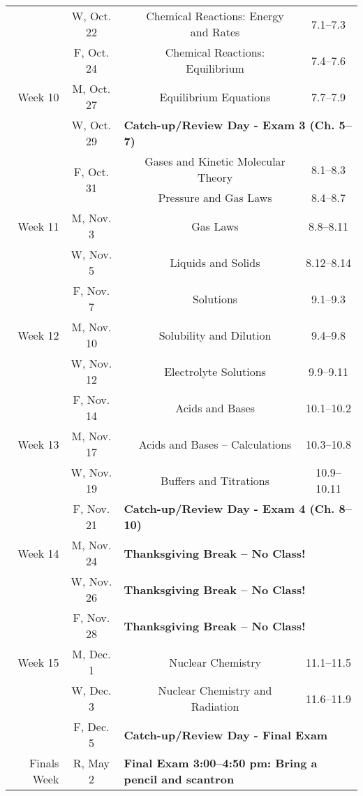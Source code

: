 \begin{tabular}{rcccc}
& W, Oct. 22&& Chemical Reactions: Energy and Rates & 7.1--7.3\\
& F, Oct. 24&& Chemical Reactions: Equilibrium & 7.4--7.6\\
\midrule
Week 10 & M, Oct. 27&& Equilibrium Equations & 7.7--7.9\\
& W, Oct. 29& \multicolumn{3}{l}{\textbf{Catch-up/Review Day - Exam 3 (Ch. 5--7)}}\\
& \multirow{2}{*}{F, Oct. 31}& & Gases and Kinetic Molecular Theory & 8.1--8.3\\
& & & Pressure and Gas Laws & 8.4--8.7\\
\midrule
Week 11 & M, Nov. 3&& Gas Laws & 8.8--8.11\\
& W, Nov. 5&& Liquids and Solids & 8.12--8.14\\
& F, Nov. 7&& Solutions & 9.1--9.3\\
\midrule
Week 12 & M, Nov. 10&& Solubility and Dilution & 9.4--9.8\\
& W, Nov. 12&& Electrolyte Solutions & 9.9--9.11\\
& F, Nov. 14&& Acids and Bases & 10.1--10.2\\
\midrule
Week 13 & M, Nov. 17&& Acids and Bases -- Calculations & 10.3--10.8\\
& W, Nov. 19&& Buffers and Titrations & 10.9--10.11\\
& F, Nov. 21& \multicolumn{3}{l}{\textbf{Catch-up/Review Day - Exam 4 (Ch. 8--10)}}\\
\midrule
Week 14 & M, Nov. 24& \multicolumn{3}{l}{\textbf{Thanksgiving Break -- No Class!}}\\
& W, Nov. 26& \multicolumn{3}{l}{\textbf{Thanksgiving Break -- No Class!}}\\
& F, Nov. 28& \multicolumn{3}{l}{\textbf{Thanksgiving Break -- No Class!}}\\
\midrule
Week 15 & M, Dec. 1&& Nuclear Chemistry & 11.1--11.5\\
& W, Dec. 3&& Nuclear Chemistry and Radiation & 11.6--11.9\\
& F, Dec. 5& \multicolumn{3}{l}{\textbf{Catch-up/Review Day - Final Exam}}\\
\midrule
Finals Week& R, May 2& \multicolumn{3}{l}{\textbf{Final Exam 3:00--4:50 pm: Bring a pencil and scantron}}\\
\end{tabular}